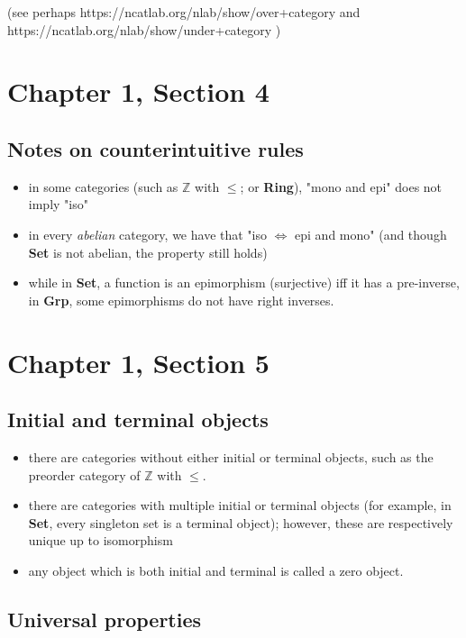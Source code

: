 \documentclass[12pt, letterpaper, twoside]{report}
\begin{document}
(see perhaps https://ncatlab.org/nlab/show/over+category and https://ncatlab.org/nlab/show/under+category )\chapter*{Chapter 1, Section 4}

\section*{Notes on counterintuitive rules}

\begin{itemize}
	\item in some categories (such as $\mathbb{Z}$ with $\leq$; or \textbf{Ring}), "mono and epi" does not imply "iso"
	\item in every \textit{abelian} category, we have that "iso $\Leftrightarrow$ epi and mono" (and though \textbf{Set} is not abelian, the property still holds)
	\item while in \textbf{Set}, a function is an epimorphism (surjective) iff it has a pre-inverse, in \textbf{Grp}, some epimorphisms do not have right inverses.
\end{itemize}

\chapter*{Chapter 1, Section 5}

\section*{Initial and terminal objects}

\begin{itemize}
	\item there are categories without either initial or terminal objects, such as the preorder category of $\mathbb{Z}$ with $\leq$.
	\item there are categories with multiple initial or terminal objects (for example, in \textbf{Set}, every singleton set is a terminal object); however, these are respectively unique up to isomorphism
	\item any object which is both initial and terminal is called a zero object.
\end{itemize}

\section*{Universal properties}
\end{document}

